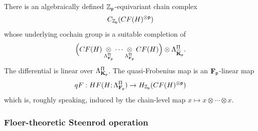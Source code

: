 \documentclass[reqno, 10pt]{amsart}
\numberwithin{equation}{section}
\numberwithin{equation}{section}
\theoremstyle{definition}
\theoremstyle{remark}
\newcommand{\beqn}{\begin{equation*}}
\newcommand{\eeqn}{\end{equation*}}
\newcommand{\mb}{\mathbb}
\newcommand{\p}{{\sf p}}
\newcommand{\fp}{{\bf F}_{\sf p}}
\newcommand{\kp}{{\bf K}_{\sf p}}
\newcommand{\tkp}{\wt{\bf K}_{\sf p}}
\newcommand{\zp}{{{\mb Z}_{\sf p}}}
\newcommand{\wt}{\widetilde}
\begin{document}
There is an algebraically defined $\zp$-equivariant chain complex 
\beqn
C_{\zp}( CF (H)^{\otimes \p})
\eeqn
whose underlying cochain group is a suitable completion of 
\beqn
\Big( CF (H) \underset{\Lambda_{\fp}^\Pi}{\otimes} \cdots \underset{\Lambda_{\fp}^\Pi}{\otimes} CF (H) \Big) \otimes \Lambda_{\tkp}^\Pi.
\eeqn
The differential is linear over $\Lambda_{\kp}^\Pi$. The quasi-Frobenius map is an $\fp$-linear map 
\beqn
qF: HF(H; \Lambda_{\fp}^\Pi) \to H_{\zp} ( CF(H)^{\otimes \p} )
\eeqn
which is, roughly speaking, induced by the chain-level map $x \mapsto x\otimes \cdots \otimes x$. 

\subsubsection{Floer-theoretic Steenrod operation}
\end{document}
